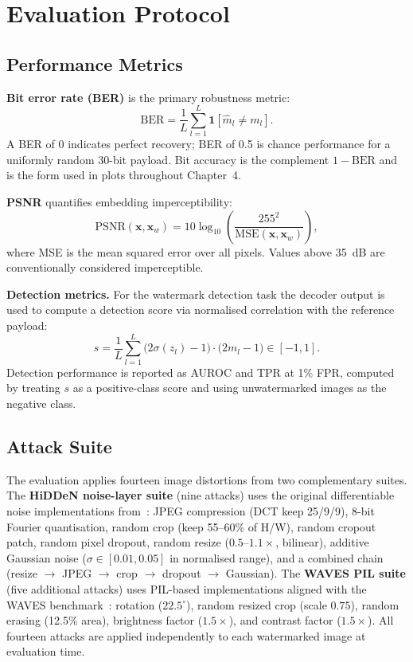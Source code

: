 ﻿\documentclass[12pt, a4paper, twoside]{report}
\numberwithin{equation}{chapter}
\begin{document}
\section{Evaluation Protocol}
\label{sec:eval-protocol}

\subsection*{Performance Metrics}

\textbf{Bit error rate (BER)} is the primary robustness metric:
\begin{equation}
    \mathrm{BER} = \frac{1}{L}\sum_{l=1}^{L}\mathbf{1}\!\left[\hat{m}_l \neq m_l\right].
    \label{eq:ber}
\end{equation}
A BER of 0 indicates perfect recovery; BER of 0.5 is chance performance for a uniformly random 30-bit payload. Bit accuracy is the complement $1-\mathrm{BER}$ and is the form used in plots throughout Chapter~4.

\textbf{PSNR} quantifies embedding imperceptibility:
\begin{equation}
    \mathrm{PSNR}(\mathbf{x}, \mathbf{x}_w) = 10\log_{10}\!\left(\frac{255^2}{\mathrm{MSE}(\mathbf{x},\mathbf{x}_w)}\right),
    \label{eq:psnr}
\end{equation}
where MSE is the mean squared error over all pixels. Values above 35~dB are conventionally considered imperceptible.

\textbf{Detection metrics.} For the watermark detection task the decoder output is used to compute a detection score via normalised correlation with the reference payload:
\begin{equation}
    s = \frac{1}{L}\sum_{l=1}^{L}\bigl(2\sigma(z_l)-1\bigr)\cdot\bigl(2m_l-1\bigr) \in [-1,1].
    \label{eq:det-score}
\end{equation}
Detection performance is reported as AUROC and TPR at 1\% FPR, computed by treating $s$ as a positive-class score and using unwatermarked images as the negative class.

\subsection*{Attack Suite}

The evaluation applies fourteen image distortions from two complementary suites. The \textbf{HiDDeN noise-layer suite} (nine attacks) uses the original differentiable noise implementations from~\citet{zhu2018}: JPEG compression (DCT keep 25/9/9), 8-bit Fourier quantisation, random crop (keep 55--60\% of H/W), random cropout patch, random pixel dropout, random resize ($0.5$--$1.1\times$, bilinear), additive Gaussian noise ($\sigma\in[0.01,0.05]$ in normalised range), and a combined chain (resize $\to$ JPEG $\to$ crop $\to$ dropout $\to$ Gaussian). The \textbf{WAVES PIL suite} (five additional attacks) uses PIL-based implementations aligned with the WAVES benchmark~\citep{an2024}: rotation ($22.5^\circ$), random resized crop (scale $0.75$), random erasing (12.5\% area), brightness factor ($1.5\times$), and contrast factor ($1.5\times$). All fourteen attacks are applied independently to each watermarked image at evaluation time.
\end{document}
